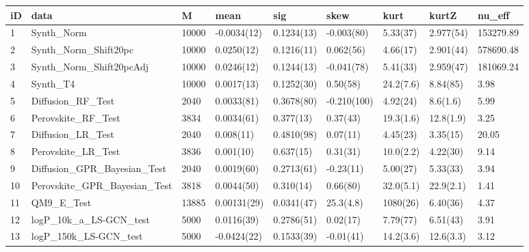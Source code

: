 
\begin{tabular}{l|l|l|l|l|l|l|l|l}
\hline
iD & data & M & mean & sig & skew & kurt & kurtZ & nu\_eff\\
\hline
1 & Synth\_Norm & 10000 & -0.0034(12) & 0.1234(13) & -0.003(80) & 5.33(37) & 2.977(54) & 153279.89\\
\hline
2 & Synth\_Norm\_Shift20pc & 10000 & 0.0250(12) & 0.1216(11) & 0.062(56) & 4.66(17) & 2.901(44) & 578690.48\\
\hline
3 & Synth\_Norm\_Shift20pcAdj & 10000 & 0.0246(12) & 0.1244(13) & -0.041(78) & 5.41(33) & 2.959(47) & 181069.24\\
\hline
4 & Synth\_T4 & 10000 & 0.0017(13) & 0.1252(30) & 0.50(58) & 24.2(7.6) & 8.84(85) & 3.98\\
\hline
5 & Diffusion\_RF\_Test & 2040 & 0.0033(81) & 0.3678(80) & -0.210(100) & 4.92(24) & 8.6(1.6) & 5.99\\
\hline
6 & Perovskite\_RF\_Test & 3834 & 0.0034(61) & 0.377(13) & 0.37(43) & 19.3(1.6) & 12.8(1.9) & 3.25\\
\hline
7 & Diffusion\_LR\_Test & 2040 & 0.008(11) & 0.4810(98) & 0.07(11) & 4.45(23) & 3.35(15) & 20.05\\
\hline
8 & Perovskite\_LR\_Test & 3836 & 0.001(10) & 0.637(15) & 0.31(31) & 10.0(2.2) & 4.22(30) & 9.14\\
\hline
9 & Diffusion\_GPR\_Bayesian\_Test & 2040 & 0.0019(60) & 0.2713(61) & -0.23(11) & 5.00(27) & 5.33(33) & 3.94\\
\hline
10 & Perovskite\_GPR\_Bayesian\_Test & 3818 & 0.0044(50) & 0.310(14) & 0.66(80) & 32.0(5.1) & 22.9(2.1) & 1.41\\
\hline
11 & QM9\_E\_Test & 13885 & 0.00131(29) & 0.0341(47) & 25.3(4.8) & 1080(26) & 6.40(36) & 4.37\\
\hline
12 & logP\_10k\_a\_LS-GCN\_test & 5000 & 0.0116(39) & 0.2786(51) & 0.02(17) & 7.79(77) & 6.51(43) & 3.91\\
\hline
13 & logP\_150k\_LS-GCN\_test & 5000 & -0.0424(22) & 0.1533(39) & -0.01(41) & 14.2(3.6) & 12.6(3.3) & 3.12\\
\hline
\end{tabular}
